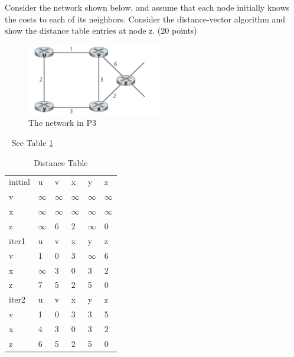 \begin{exercise}[]{Consider the network shown below, and assume that each node initially knows
  the costs to each of its neighbors. Consider the distance-vector algorithm and show the
  distance table entries at node z. (20 points)}

  \begin{figure}[hb]
    \begin{center}
    \includegraphics[width=6cm]{img/ass4/ex3}
    \caption{The network in P3}
    \label{fig:ex3}
    \end{center}
  \end{figure}
  \begin{solution}
  \par{~}
  See Table \ref{tab:ex3}

  \begin{table}[h]
    \centering
    \begin{tabular}{llllll}\hline
    initial & u & v & x & y & z \\
    v                & $\infty$          & $\infty$ & $\infty$ & $\infty$ & $\infty$ \\
    x                & $\infty$          & $\infty$ & $\infty$ & $\infty$ & $\infty$ \\
    z                & $\infty$          & 6 & 2 & $\infty$ & 0 \\\hline
    iter1            & u          & v & x & y & z \\
    v                & 1          & 0 & 3 & $\infty$ & 6 \\
    x                & $\infty$          & 3 & 0 & 3 & 2 \\
    z                & 7          & 5 & 2 & 5 & 0 \\\hline
    iter2            & u          & v & x & y & z \\
    v                & 1          & 0 & 3 & 3 & 5 \\
    x                & 4          & 3 & 0 & 3 & 2 \\
    z                & 6          & 5 & 2 & 5 & 0\\\hline
    \end{tabular}
    \caption{Distance Table \label{tab:ex3}}
    \end{table}
  \end{solution}
  \label{ex3}
\end{exercise}




